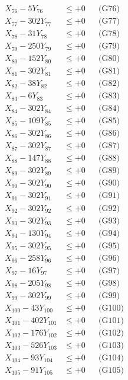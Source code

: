 \documentclass[a4paper,10pt]{article}
\begin{document}
{\begin{align}
X_{76} - 5Y_{76} &\leq +0 && \text{(G76)} \\
X_{77} - 302Y_{77} &\leq +0 && \text{(G77)} \\
X_{78} - 31Y_{78} &\leq +0 && \text{(G78)} \\
X_{79} - 250Y_{79} &\leq +0 && \text{(G79)} \\
X_{80} - 152Y_{80} &\leq +0 && \text{(G80)} \\
\allowbreak
X_{81} - 302Y_{81} &\leq +0 && \text{(G81)} \\
X_{82} - 38Y_{82} &\leq +0 && \text{(G82)} \\
X_{83} - 6Y_{83} &\leq +0 && \text{(G83)} \\
X_{84} - 302Y_{84} &\leq +0 && \text{(G84)} \\
X_{85} - 109Y_{85} &\leq +0 && \text{(G85)} \\
X_{86} - 302Y_{86} &\leq +0 && \text{(G86)} \\
X_{87} - 302Y_{87} &\leq +0 && \text{(G87)} \\
X_{88} - 147Y_{88} &\leq +0 && \text{(G88)} \\
X_{89} - 302Y_{89} &\leq +0 && \text{(G89)} \\
X_{90} - 302Y_{90} &\leq +0 && \text{(G90)} \\
\allowbreak
X_{91} - 302Y_{91} &\leq +0 && \text{(G91)} \\
X_{92} - 302Y_{92} &\leq +0 && \text{(G92)} \\
X_{93} - 302Y_{93} &\leq +0 && \text{(G93)} \\
X_{94} - 130Y_{94} &\leq +0 && \text{(G94)} \\
X_{95} - 302Y_{95} &\leq +0 && \text{(G95)} \\
X_{96} - 258Y_{96} &\leq +0 && \text{(G96)} \\
X_{97} - 16Y_{97} &\leq +0 && \text{(G97)} \\
X_{98} - 205Y_{98} &\leq +0 && \text{(G98)} \\
X_{99} - 302Y_{99} &\leq +0 && \text{(G99)} \\
X_{100} - 43Y_{100} &\leq +0 && \text{(G100)} \\
\allowbreak
X_{101} - 402Y_{101} &\leq +0 && \text{(G101)} \\
X_{102} - 176Y_{102} &\leq +0 && \text{(G102)} \\
X_{103} - 526Y_{103} &\leq +0 && \text{(G103)} \\
X_{104} - 93Y_{104} &\leq +0 && \text{(G104)} \\
X_{105} - 91Y_{105} &\leq +0 && \text{(G105)} \\

\end{align}}
\end{document}

